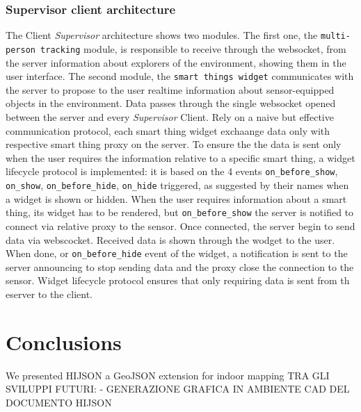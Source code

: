 \documentclass{sig-alternate}
\begin{document}
\subsubsection{Supervisor client architecture}\label{supervisor-client-architecture}

The Client \emph{Supervisor} architecture shows two modules. The first
one, the \texttt{multi-person\ tracking} module, is responsible to
receive through the websocket, from the server information about
explorers of the environment, showing them in the user interface. The
second module, the \texttt{smart\ things\ widget} communicates with the
server to propose to the user realtime information about sensor-equipped
objects in the environment. Data passes through the single websocket
opened between the server and every \emph{Supervisor} Client. Rely on a
naive but effective communication protocol, each smart thing widget
exchaange data only with respective smart thing proxy on the server. To
ensure the the data is sent only when the user requires the information
relative to a specific smart thing, a widget lifecycle protocol is
implemented: it is based on the 4 events \texttt{on\_before\_show},
\texttt{on\_show}, \texttt{on\_before\_hide}, \texttt{on\_hide}
triggered, as suggested by their names when a widget is shown or hidden.
When the user requires information about a smart thing, its widget has
to be rendered, but \texttt{on\_before\_show} the server is notified to
connect via relative proxy to the sensor. Once connected, the server
begin to send data via webscocket. Received data is shown through the
wodget to the user. When done, or \texttt{on\_before\_hide} event of the
widget, a notification is sent to the server announcing to stop sending
data and the proxy close the connection to the sensor. Widget lifecycle
protocol ensures that only requiring data is sent from th eserver to the
client.

\section{Conclusions}\label{conclusions}

We presented HIJSON a GeoJSON extension for indoor mapping TRA GLI
SVILUPPI FUTURI: - GENERAZIONE GRAFICA IN AMBIENTE CAD DEL DOCUMENTO
HIJSON

%

%
%
\end{document}
